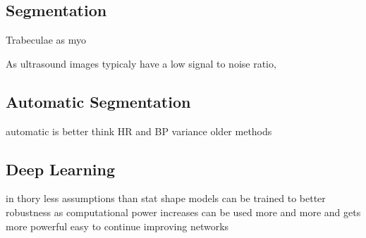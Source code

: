 \documentclass{article}
\begin{document}
{\subsection{Segmentation}
Trabeculae as myo \cite{jacc_ef_p_and_c}

As ultrasound images typicaly have a low signal to noise ratio,
\subsection{Automatic Segmentation}
automatic is better think HR and BP
variance
older methods
\subsection{Deep Learning}
in thory less assumptions than stat shape models
can be trained to better robustness
as computational power increases can be used more and more and gets more powerful
easy to continue improving networks
}
\end{document}
